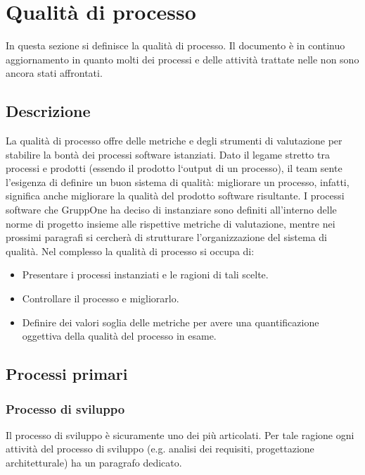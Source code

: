 \documentclass[../piano-di-qualifica.tex]{subfiles}
\begin{document}
\section{Qualità di processo}%
\label{sec:qualità_di_processo}
In questa sezione si definisce la qualità di processo. Il documento è in continuo aggiornamento in quanto molti dei processi e delle attività trattate nelle  non sono ancora stati affrontati.

\subsection{Descrizione}%
\label{sub:descrizione}

La qualità di processo offre delle metriche e degli strumenti di valutazione per stabilire la bontà dei processi software istanziati. 
Dato il legame stretto tra processi e prodotti (essendo il prodotto l`output di un processo), il team sente l'esigenza di definire un buon sistema di qualità: migliorare un processo, infatti, significa anche migliorare la qualità del prodotto software risultante. 
I processi software che GruppOne ha deciso di instanziare sono definiti all'interno delle norme di progetto insieme alle rispettive metriche di valutazione, mentre nei prossimi paragrafi si cercherà di strutturare l'organizzazione del sistema di qualità. 
Nel complesso la qualità di processo si occupa di:
\begin{itemize}
	\item Presentare i processi instanziati e le ragioni di tali scelte.
	\item Controllare il processo e migliorarlo.
	\item Definire dei valori soglia delle metriche per avere una quantificazione oggettiva della qualità del processo in esame.
\end{itemize}

\subsection{Processi primari}%
\label{sub:processi_primari}

\subsubsection{Processo di sviluppo}%
\label{subs:processo_di_sviluppo}
Il processo di sviluppo è sicuramente uno dei più articolati. Per tale ragione ogni attività del processo di sviluppo (e.g. analisi dei requisiti, progettazione architetturale) ha un paragrafo dedicato.
\end{document}
